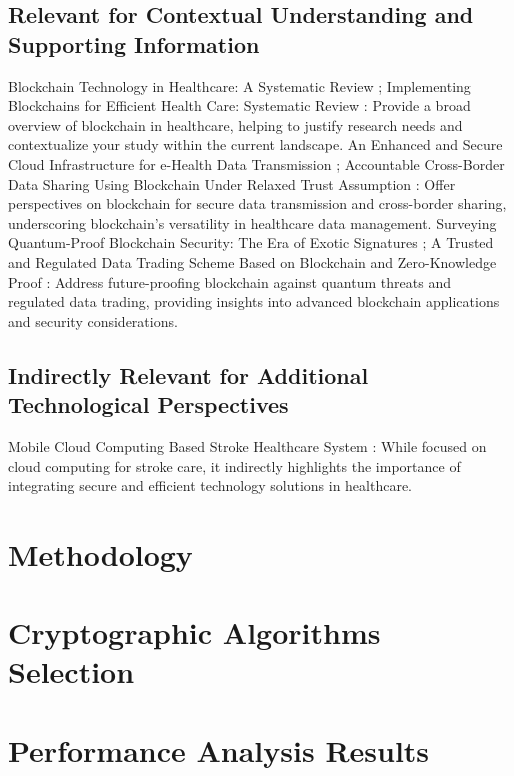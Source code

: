 \documentclass[cic,tc,english]{iiufrgs}
\begin{document}
\section{Relevant for Contextual Understanding and Supporting Information}

    Blockchain Technology in Healthcare: A Systematic Review \cite{Saeed2022}; Implementing Blockchains for Efficient Health Care: Systematic Review \cite{Vazirani2019}: Provide a broad overview of blockchain in healthcare, helping to justify research needs and contextualize your study within the current landscape.
    An Enhanced and Secure Cloud Infrastructure for e-Health Data Transmission \cite{Memos2021}; Accountable Cross-Border Data Sharing Using Blockchain Under Relaxed Trust Assumption \cite{Rahman2020}: Offer perspectives on blockchain for secure data transmission and cross-border sharing, underscoring blockchain's versatility in healthcare data management.
    Surveying Quantum-Proof Blockchain Security: The Era of Exotic Signatures \cite{Naz2024}; A Trusted and Regulated Data Trading Scheme Based on Blockchain and Zero-Knowledge Proof \cite{Li2024}: Address future-proofing blockchain against quantum threats and regulated data trading, providing insights into advanced blockchain applications and security considerations.

\section{Indirectly Relevant for Additional Technological Perspectives}

    Mobile Cloud Computing Based Stroke Healthcare System \cite{Karaca2019}: While focused on cloud computing for stroke care, it indirectly highlights the importance of integrating secure and efficient technology solutions in healthcare.

\chapter{Methodology}


\chapter{Cryptographic Algorithms Selection}


\chapter{Performance Analysis Results}
\end{document}
